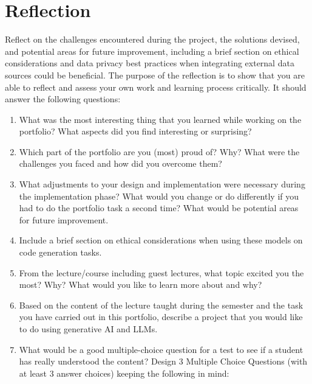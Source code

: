 \section{Reflection}
\label{sec:reflection}

Reflect on the challenges encountered during the project, the solutions devised, and potential areas for future improvement, including a brief section on ethical considerations and data privacy best practices when integrating external data sources could be beneficial. The purpose of the reflection is to show that you are able to reflect and assess your own work and learning process critically. It should answer the following questions:

\begin{enumerate}
    \item What was the most interesting thing that you learned while working on the portfolio? What aspects did you find interesting or surprising?
    \item Which part of the portfolio are you (most) proud of? Why? What were the challenges you faced and how did you overcome them?
    \item What adjustments to your design and implementation were necessary during the implementation phase? What would you change or do differently if you had to do the portfolio task a second time? What would be potential areas for future improvement. 

    \item Include a brief section on ethical considerations when using these models on code generation tasks. 
    \item From the lecture/course including guest lectures, what topic excited you the most? Why? What would you like to learn more about and why?

    \item Based on the content of the lecture taught during the semester and the task you have carried out in this portfolio, describe a project that you would like to do using generative AI and LLMs. 

    \item What would be a good multiple-choice question for a test to see if a student has really understood the content?  Design 3 Multiple Choice Questions (with at least 3 answer choices) keeping the following in mind:


\end{enumerate}
